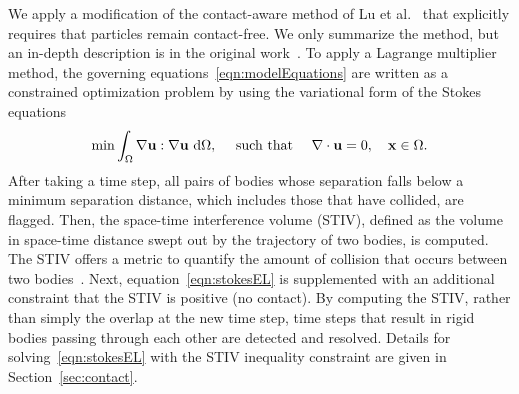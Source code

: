 \documentclass[AMA,STIX1COL]{WileyNJD-v2}
\begin{document}
We apply a modification of the contact-aware method of Lu et
al.~\cite{Lu2017} that explicitly requires that particles remain
contact-free. We only summarize the method, but an in-depth description
is in the original work~\cite{Lu2017}.  To apply a Lagrange multiplier
method, the governing equations~\eqref{eqn:modelEquations} are written
as a constrained optimization problem by using the variational form of
the Stokes equations
\begin{align}
  \min \int_{\Omega} \nabla{\mathbf{u}}:\nabla{\mathbf{u}}~\text{d}\Omega,
  \quad\text{ such that }\quad \nabla\cdot{\mathbf{u}} = 0, 
  \quad {\mathbf{x}} \in \Omega.
  \label{eqn:stokesEL}
\end{align} 
After taking a time step, all pairs of bodies whose separation falls
below a minimum separation distance, which includes those that have
collided, are flagged.  Then, the space-time interference volume (STIV),
defined as the volume in space-time distance swept out by the trajectory
of two bodies, is computed.  The STIV offers a metric to quantify the
amount of collision that occurs between two bodies~\cite{Lu2017,
Harmon2011}.  Next, equation~\eqref{eqn:stokesEL} is supplemented with
an additional constraint that the STIV is positive (no contact).  By
computing the STIV, rather than simply the overlap at the new time step,
time steps that result in rigid bodies passing through each other are
detected and resolved.  Details for solving~\eqref{eqn:stokesEL} with
the STIV inequality constraint are given in Section~\ref{sec:contact}.
\end{document}
